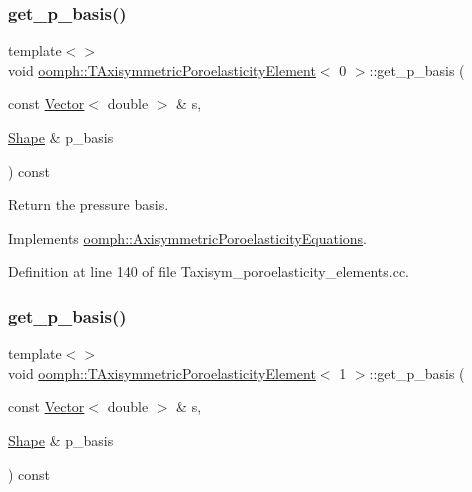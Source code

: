 \subsubsection{\texorpdfstring{get\+\_\+p\+\_\+basis()}{get\_p\_basis()}\hspace{0.1cm}{\footnotesize\ttfamily [1/3]}}
{\footnotesize\ttfamily template$<$$>$ \\
void \hyperlink{classoomph_1_1TAxisymmetricPoroelasticityElement}{oomph\+::\+T\+Axisymmetric\+Poroelasticity\+Element}$<$ 0 $>$\+::get\+\_\+p\+\_\+basis (\begin{DoxyParamCaption}\item[{const \hyperlink{classoomph_1_1Vector}{Vector}$<$ double $>$ \&}]{s,  }\item[{\hyperlink{classoomph_1_1Shape}{Shape} \&}]{p\+\_\+basis }\end{DoxyParamCaption}) const\hspace{0.3cm}{\ttfamily [virtual]}}



Return the pressure basis. 



Implements \hyperlink{classoomph_1_1AxisymmetricPoroelasticityEquations_ae3a7d5fd68eb6c68770d7783013bda19}{oomph\+::\+Axisymmetric\+Poroelasticity\+Equations}.



Definition at line 140 of file Taxisym\+\_\+poroelasticity\+\_\+elements.\+cc.

\mbox{\label{classoomph_1_1TAxisymmetricPoroelasticityElement_abb0d8bbdf015bd4ef8b1d8637f93bc6d}} 
\subsubsection{\texorpdfstring{get\+\_\+p\+\_\+basis()}{get\_p\_basis()}\hspace{0.1cm}{\footnotesize\ttfamily [2/3]}}
{\footnotesize\ttfamily template$<$$>$ \\
void \hyperlink{classoomph_1_1TAxisymmetricPoroelasticityElement}{oomph\+::\+T\+Axisymmetric\+Poroelasticity\+Element}$<$ 1 $>$\+::get\+\_\+p\+\_\+basis (\begin{DoxyParamCaption}\item[{const \hyperlink{classoomph_1_1Vector}{Vector}$<$ double $>$ \&}]{s,  }\item[{\hyperlink{classoomph_1_1Shape}{Shape} \&}]{p\+\_\+basis }\end{DoxyParamCaption}) const\hspace{0.3cm}{\ttfamily [virtual]}}



